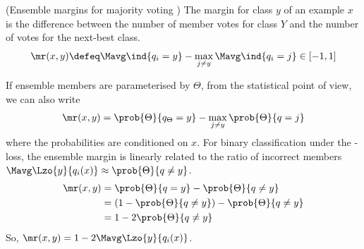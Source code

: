 \documentclass[
    a4paper, %
	fontsize=10pt, %
	twoside=false, %
]{kaobook}
\begin{document}
\begin{titlepage}
\begin{definition} (Ensemble margins for majority voting \cite{breiman})
The margin for class $y$ of an example $x$ is the difference between the number of member votes for class $Y$ and the number of votes for the next-best class.
	$$
\mr(x,y) \defeq \Mavg \ind{q_{i} = y} - \max_{j \neq y} \Mavg \ind{q_{i} = j} \in [-1, 1]
$$
\label{def:ensemble-margin}
\end{definition}

If ensemble members are parameterised by $\Theta$, from the statistical point of view, we can also write
$$
\mr(x,y) = \prob{\Theta}{q_{\Theta} = y} - \max_{j \not=y} \prob{\Theta}{q=j}
$$
where the probabilities are conditioned on $x$. For binary classification under the \zeroone-loss, the ensemble margin is linearly related to the ratio of incorrect members $\Mavg \Lzo{y}{q_{i}(x)} \approx \prob{\Theta}{q \not= y}$.
$$
\begin{align*}
\mr(x,y) &= \prob{\Theta}{q=y}  - \prob{\Theta}{q \not= y} \\
&= (1 - \prob{\Theta}{q \not= y}) - \prob{\Theta}{q \not= y} \\
&= 1 - 2 \prob{\Theta}{q \not= y}
\end{align*}
$$
So, $\mr(x,y) = 1 - 2 \Mavg\Lzo{y}{q_{i}(x)}$.





\end{titlepage}
\end{document}
